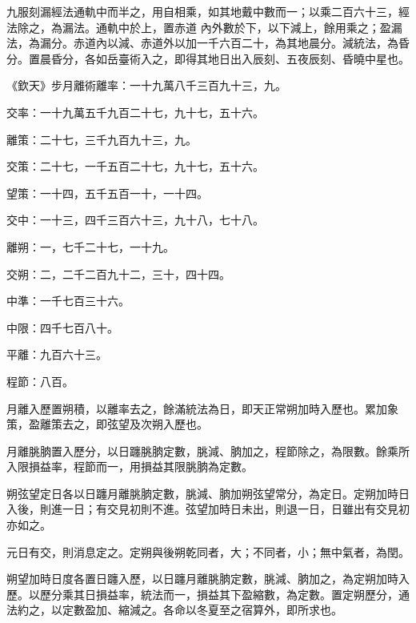 \begin{pinyinscope}
 九服刻漏經法通軌中而半之，用自相乘，如其地戴中數而一；以乘二百六十三，經法除之，為漏法。通軌中於上，置赤道
 內外數於下，以下減上，餘用乘之；盈漏法，為漏分。赤道內以減、赤道外以加一千六百二十，為其地晨分。減統法，為昏分。置晨昏分，各如岳臺術入之，即得其地日出入辰刻、五夜辰刻、昏曉中星也。



 《欽天》步月離術離率：一十九萬八千三百九十三，九。



 交率：一十九萬五千九百二十七，九十七，五十六。



 離策：二十七，三千九百九十三，九。



 交策：二十七，一千五百二十七，九十七，五十六。



 望策：一十四，五千五百一十，一十四。



 交中：一十三，四千三百六十三，九十八，七十八。



 離朔：一，七千二十七，一十九。



 交朔：二，二千二百九十二，三十，四十四。



 中準：一千七百三十六。



 中限：四千七百八十。



 平離：九百六十三。



 程節：八百。



 月離入歷置朔積，以離率去之，餘滿統法為日，即天正常朔加時入歷也。累加象策，盈離策去之，即弦望及次朔入歷也。



 月離朓朒置入歷分，以日躔朓朒定數，朓減、朒加之，程節除之，為限數。餘乘所入限損益率，程節而一，用損益其限朓朒為定數。



 朔弦望定日各以日躔月離朓朒定數，朓減、朒加朔弦望常分，為定日。定朔加時日入後，則進一日；有交見初則不進。弦望加時日未出，則退一日，日雖出有交見初亦如之。



 元日有交，則消息定之。定朔與後朔乾同者，大；不同者，小；無中氣者，為閏。



 朔望加時日度各置日躔入歷，以日躔月離朓朒定數，朓減、朒加之，為定朔加時入歷。以歷分乘其日損益率，統法而一，損益其下盈縮數，為定數。置定朔歷分，通法約之，以定數盈加、縮減之。各命以冬夏至之宿算外，即所求也。




\end{pinyinscope}
